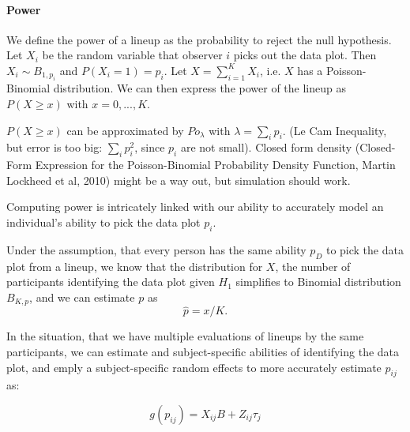 \documentclass[11pt]{article}
\begin{document}
\paragraph{Power}
We define the power of a lineup as the probability to reject the null hypothesis. Let $X_i$ be the random variable that observer $i$ picks out the data plot. Then $X_i \sim B_{1, p_i}$ and $P(X_i = 1) = p_i$. Let $X = \sum_{i=1}^K X_i$, i.e. $X$ has a Poisson-Binomial distribution.
We can then express the power of the lineup as $P(X \ge x)$ with $x = 0, ..., K$.

$P(X \ge x)$ can be approximated by $Po_\lambda$ with $\lambda= \sum_i p_i$. (Le Cam Inequality, but error is too big: $\sum_i p_i^2$, since $p_i$ are not small). Closed form density (Closed-Form Expression for the Poisson-Binomial Probability Density Function, Martin Lockheed et al, 2010) might be a way out, but simulation should work. 

Computing power  is intricately linked with our ability to accurately model an individual's ability to pick the data plot $p_i$.

Under the assumption, that every person has the same ability $p_D$ to pick the data plot from a lineup, we know that the distribution for $X$, the number of participants identifying the data plot given $H_1$  simplifies to  Binomial distribution $B_{K, p}$, and we can estimate $p$ as
\[
\hat{p} = x/K.
\] 


In the situation, that we have multiple evaluations of lineups by the same participants, we can estimate and subject-specific abilities of identifying the data plot, and emply a subject-specific random effects to more accurately estimate $p_{ij}$ as: 

\begin{equation}
g(p_{ij}) = X_{ij}B  + Z_{ij} \tau_j 
\label{mixed} 
\end{equation}
%
\end{document}
